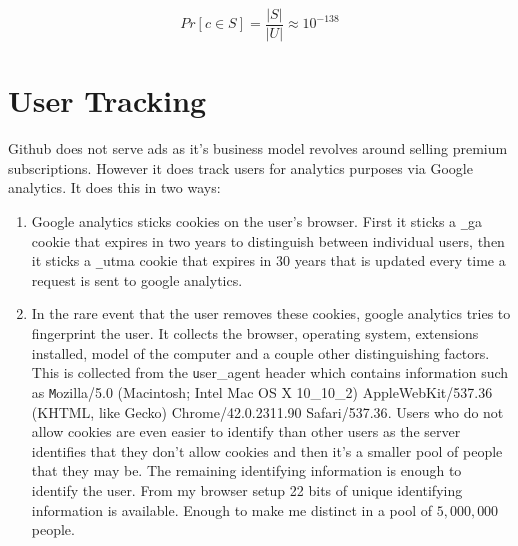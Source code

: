 \documentclass[12pt]{article}
\renewcommand{\tt}[1]{\texttt{#1}}
\begin{document}
$$Pr[c \in S] = \frac{|S|}{|U|} \approx 10^{-138}$$


\section{User Tracking}\label{tracking}
Github does not serve ads as it's business model revolves around selling premium subscriptions. However it does track users for analytics purposes via Google analytics. It does this in two ways:

\begin{enumerate}
\item Google analytics sticks cookies on the user's browser. First it sticks a {\tt \_ga} cookie that expires in two years to distinguish between individual users, then it sticks a {\tt \_utma} cookie that expires in 30 years that is updated every time a request is sent to google analytics. 

\item In the rare event that the user removes these cookies, google analytics tries to fingerprint the user. It collects the browser, operating system, extensions installed, model of the computer and a couple other distinguishing factors. This is collected from the {\tt user\_agent} header which contains information such as {\tt Mozilla/5.0 (Macintosh; Intel Mac OS X 10\_10\_2) AppleWebKit/537.36 (KHTML, like Gecko) Chrome/42.0.2311.90 Safari/537.36}. Users who do not allow cookies are even easier to identify than other users as the server identifies that they don't allow cookies and then it's a smaller pool of people that they may be. The remaining identifying information is enough to identify the user. From my browser setup 22 bits of unique identifying information is available. Enough to make me distinct in a pool of $5,000,000$ people.


\end{enumerate}
\end{document}
